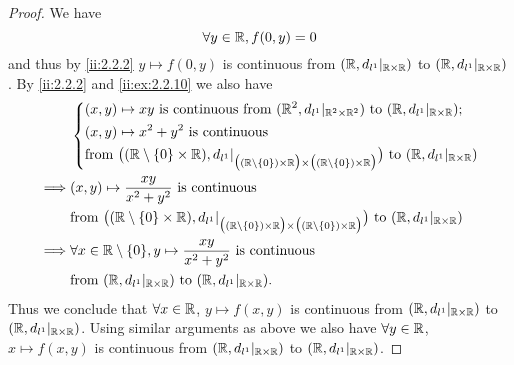 \begin{proof}
  We have
  \[
    \forall y \in \mathbb{R}, f(0, y) = 0
  \]
  and thus by \cref{ii:2.2.2} \(y \mapsto f(0, y)\) is continuous from \((\mathbb{R}, d_{l^1}|_{\mathbb{R} \times \mathbb{R}})\) to \((\mathbb{R}, d_{l^1}|_{\mathbb{R} \times \mathbb{R}})\).
  By \cref{ii:2.2.2} and \cref{ii:ex:2.2.10} we also have
  \begin{align*}
             & \begin{dcases}
                 (x, y) \mapsto x y \text{ is continuous from } (\R^2, d_{l^1}|_{\R^2 \times \R^2}) \text{ to } (\R, d_{l^1}|_{\R \times \R}); \\
                 (x, y) \mapsto x^2 + y^2 \text{ is continuous}                                                                                \\
                 \text{from } \big((\R \setminus \set{0} \times \R), d_{l^1}|_{\big((\R \setminus \set{0}) \times \R\big) \times \big((\R \setminus \set{0}) \times \R\big)}\big) \text{ to } (\R, d_{l^1}|_{\R \times \R})
               \end{dcases}  \\
    \implies & (x, y) \mapsto \dfrac{xy}{x^2 + y^2} \text{ is continuous}                                                                                                                                                 \\
             & \text{from } \big((\R \setminus \set{0} \times \R), d_{l^1}|_{\big((\R \setminus \set{0}) \times \R\big) \times \big((\R \setminus \set{0}) \times \R\big)}\big) \text{ to } (\R, d_{l^1}|_{\R \times \R}) \\
    \implies & \forall x \in \R \setminus \set{0}, y \mapsto \dfrac{xy}{x^2 + y^2} \text{ is continuous}                                                                                                                  \\
             & \text{from } (\R, d_{l^1}|_{\R \times \R}) \text{ to } (\R, d_{l^1}|_{\R \times \R}).
  \end{align*}
  Thus we conclude that \(\forall x \in \mathbb{R}\), \(y \mapsto f(x, y)\) is continuous from \((\mathbb{R}, d_{l^1}|_{\mathbb{R} \times \mathbb{R}})\) to \((\mathbb{R}, d_{l^1}|_{\mathbb{R} \times \mathbb{R}})\).
  Using similar arguments as above we also have \(\forall y \in \mathbb{R}\), \(x \mapsto f(x, y)\) is continuous from \((\mathbb{R}, d_{l^1}|_{\mathbb{R} \times \mathbb{R}})\) to \((\mathbb{R}, d_{l^1}|_{\mathbb{R} \times \mathbb{R}})\).


\end{proof}
